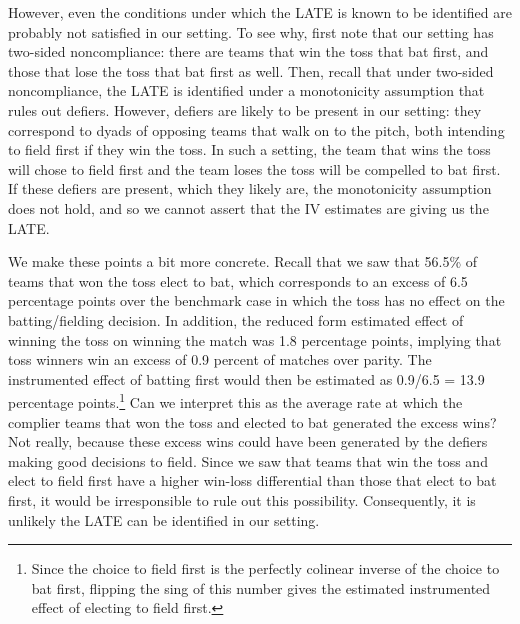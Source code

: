 \documentclass[11pt,  letterpaper]{article}
\begin{document}
However, even the conditions under which the LATE is known to be identified are probably not satisfied in our setting. To see why, first note that our setting has two-sided noncompliance: there are teams that win the toss that bat first, and those that lose the toss that bat first as well. Then, recall that under two-sided noncompliance, the LATE is identified under a monotonicity assumption that rules out defiers. However, defiers are likely to be present in our setting: they correspond to dyads of opposing teams that walk on to the pitch, both intending to field first if they win the toss. In such a setting, the team that wins the toss will chose to field first and the team loses the toss will be compelled to bat first. If these defiers are present, which they likely are, the monotonicity assumption does not hold, and so we cannot assert that the IV estimates are giving us the LATE.

We make these points a bit more concrete. Recall that we saw that 56.5\% of teams that won the toss elect to bat, which corresponds to an excess of 6.5 percentage points over the benchmark case in which the toss has no effect on the batting/fielding decision. In addition, the reduced form estimated effect of winning the toss on winning the match was 1.8 percentage points, implying that toss winners win an excess of 0.9 percent of matches over parity. The instrumented effect of batting first would then be estimated as 0.9/6.5 = 13.9 percentage points.\footnote{Since the choice to field first is the perfectly colinear inverse of the choice to bat first, flipping the sing of this number gives the estimated instrumented effect of electing to field first.}  Can we interpret this as the average rate at which the complier teams that won the toss and elected to bat generated the excess wins? Not really, because these excess wins could have been generated by the defiers making good decisions to field. Since we saw that teams that win the toss and elect to field first have a higher win-loss differential than those that elect to bat first, it would be irresponsible to rule out this possibility. Consequently, it is unlikely the LATE can be identified in our setting.


\end{document}
